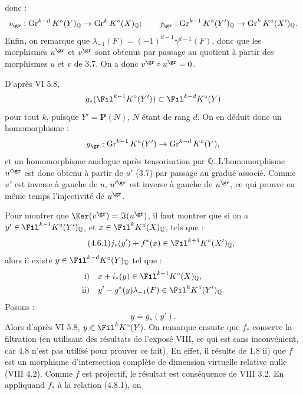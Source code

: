 donc :
\[
  i_{\gr}:\operatorname{Gr}^{k-d}K^\circ(Y)_{\mathbb Q}
  \to \operatorname{Gr}^{k}K^\circ(X)_{\mathbb Q};
  \qquad
  j_{\gr}:\operatorname{Gr}^{k-1}K^\circ(Y')_{\mathbb Q}
  \to \operatorname{Gr}^{k}K^\circ(X')_{\mathbb Q}.
\]
Enfin, on remarque que \(\lambda_{-1}(F)=(-1)^{d-1}\gamma^{d-1}(F)\), donc que les morphismes \(u^{\gr}\) et \(v^{\gr}\) sont obtenus par passage au quotient à partir des morphismes \(u\) et \(v\) de 3.7. On a donc \(v^{\gr}\circ u^{\gr}=0\).

D'après VI 5.8,
\[
  g_*(\Fil^{k-1}K^\circ(Y'))\subset \Fil^{k-d}K^\circ(Y)
\]
pour tout \(k\), puisque \(Y'=\mathbf P(N)\), \(N\) étant de rang \(d\). On en déduit donc un homomorphisme :
\[
  g_{\gr}:\operatorname{Gr}^{k-1}K^\circ(Y')
  \to\operatorname{Gr}^{k-d}K^\circ(Y),
\]
et un homomorphisme analogue après tensorisation par \(\mathbb Q\). L'homomorphisme \(u'^{\gr}\) est donc obtenu à partir de \(u'\) (3.7) par passage au gradué associé. Comme \(u'\) est inverse à gauche de \(u\), \(u'^{\gr}\) est inverse à gauche de \(u^{\gr}\), ce qui prouve en même temps l'injectivité de \(u^{\gr}\).

Pour montrer que \(\Ker(v^{\gr})=\Im(u^{\gr})\), il faut montrer que si on a \(y'\in\Fil^{k-1}K^\circ(Y')_{\mathbb Q}\), et \(x\in\Fil^kK^\circ(X)_{\mathbb Q}\), tels que :
\begin{equation}\tag{4.6.1}
  j_*(y')+f^*(x)\in\Fil^{k+1}K^\circ(X')_{\mathbb Q},
\end{equation}
alors il existe \(y\in\Fil^{k-d}K^\circ(Y)_{\mathbb Q}\) tel que :
\[
\begin{aligned}
\text{i)}\quad &x+i_*(y)\in\Fil^{k+1}K^\circ(X)_{\mathbb Q},\\
\text{ii)}\quad &y'-g^*(y)\lambda_{-1}(F)\in\Fil^{k}K^\circ(Y')_{\mathbb Q}.
\end{aligned}
\]
Posons :
\[
  y=g_*(y').
\]
Alors d'après VI 5.8, \(y\in\Fil^{k}K^\circ(Y)\). On remarque ensuite que \(f_*\) conserve la filtration (en utilisant des résultats de l'exposé VIII, ce qui est sans inconvénient, car 4.8 n'est pas utilisé pour prouver ce fait). En effet, il résulte de 1.8 ii) que \(f\) est un morphisme d'intersection complète de dimension virtuelle relative nulle (VIII 4.2). Comme \(f\) est projectif, le résultat est conséquence de VIII 3.2. En appliquand \(f_*\) à la relation (4.8.1), on
